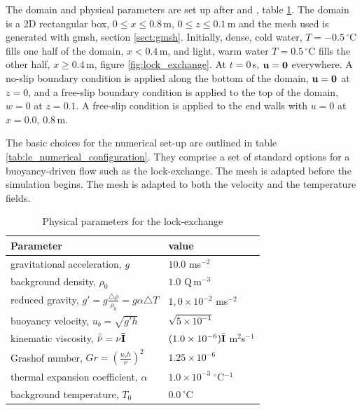 The domain and physical parameters are set up after \cite{fringer_06} and \cite{ozgokmen_07}, table \ref{tab:le_physical_parameters}. The domain is a 2D rectangular box, $0\leq x \leq 0.8\,$m, $0 \leq z \leq 0.1\,$m and the mesh used is generated with gmsh, section \ref{sect:gmsh}. Initially, dense, cold water, $T = -0.5\,^\circ$C fills one half of the domain, $x<0.4\,$m, and light, warm water $T = 0.5\,^\circ$C fills the other half, $x\geq0.4\,$m, figure \ref{fig:lock_exchange}. At $t=0\,$s, ${\bf u} = {\bf 0}$ everywhere. A no-slip boundary condition is applied along the bottom of the domain, ${\bf u = 0}$ at $z=0$, and a free-slip boundary condition is applied to the top of the domain, $w = 0$ at $z = 0.1$. A free-slip condition is applied to the end walls with $u=0$ at $x = 0.0,\, 0.8\,$m.

The basic choices for the numerical set-up are outlined in table \ref{tab:le_numerical_configuration}. They comprise a set of standard options for a buoyancy-driven flow such as the lock-exchange. The mesh is adapted before the simulation begins. The mesh is adapted to both the velocity and the temperature fields.  

\begin{table}[th]
\centering
\begin{tabular}[h]{ll}  \hline
Parameter                                                                     & value \\ \hline
gravitational acceleration, $g$                                               & $10.0$ ms$^{-2}$ \\
background density, $\rho_0$                                                  & $1.0$ Q$\,$m$^{-3}$ \\
reduced gravity, $g' = g\frac{\triangle \rho}{\rho_0} = g\alpha \triangle T $ & $1,0 \times 10^{-2}$ ms$^{-2}$ \\
buoyancy velocity, $u_b = \sqrt{g'h}$                                         & $\sqrt{5 \times 10^{-4}}$ \\
kinematic viscosity, $\bar{\bar{\bf \nu}} = \nu\bar{\bf I}$                   & $(1.0 \times 10^{-6})\bar{\bf I}$ m$^2$s$^{-1}$ \\
Grashof number, $Gr = \left( \frac{u_bh}{\nu} \right)^2$                      & $1.25 \times 10^{-6}$\\
thermal expansion coefficient, $\alpha$                                       & $1.0 \times 10^{-3} \;^\circ$C$^{-1}$ \\
background temperature, $T_0$                                                 & $0.0\,^{\circ}$C \\ \hline
\end{tabular}
\caption{Physical parameters for the lock-exchange}
\label{tab:le_physical_parameters}
\end{table}

